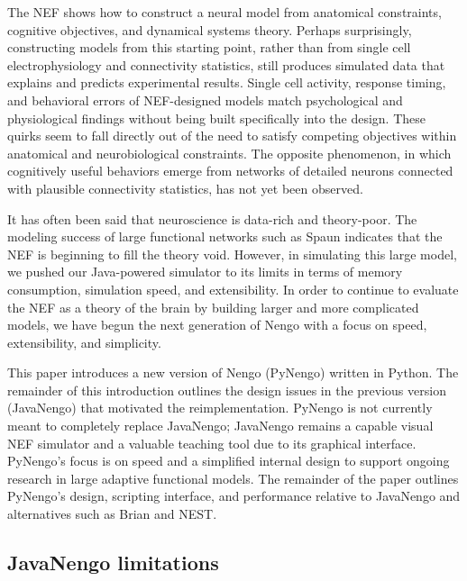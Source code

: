 \documentclass{frontiersSCNS}
\begin{document}
The NEF shows how to
construct a neural model
from anatomical constraints,
cognitive objectives, and
dynamical systems theory.
Perhaps surprisingly,
constructing models from this starting point,
rather than from single cell electrophysiology
and connectivity statistics,
still produces simulated data that explains
and predicts experimental results.
Single cell activity,
response timing, and behavioral errors
of NEF-designed models match
psychological and physiological findings
without being built specifically into the design.
These quirks seem to fall directly out
of the need to satisfy competing objectives
within anatomical and neurobiological constraints.
The opposite phenomenon, in which
cognitively useful behaviors emerge
from networks of detailed neurons
connected with plausible connectivity statistics,
has not yet been observed.

It has often been said that neuroscience
is data-rich and theory-poor.
The modeling success of
large functional networks such as Spaun
indicates that the NEF
is beginning to fill the theory void.
However, in simulating this large model,
we pushed our Java-powered simulator
to its limits in terms of memory consumption,
simulation speed, and extensibility.
In order to continue to evaluate the NEF
as a theory of the brain
by building larger and more complicated models,
we have begun the next generation
of Nengo with a focus on speed,
extensibility, and simplicity.

This paper introduces a new version
of Nengo (PyNengo) written in Python.
The remainder of this introduction outlines
the design issues in the previous version (JavaNengo)
that motivated the reimplementation.
PyNengo is not currently meant
to completely replace JavaNengo;
JavaNengo remains a capable visual NEF
simulator and a valuable teaching tool
due to its graphical interface.
PyNengo's focus is on speed
and a simplified internal design
to support ongoing research in
large adaptive functional models.
The remainder of the paper outlines PyNengo's design,
scripting interface, and performance relative to
JavaNengo and alternatives such as Brian and NEST.

\subsection{JavaNengo limitations}
\end{document}
